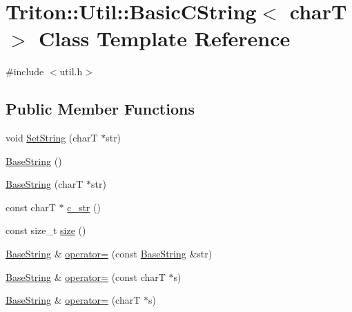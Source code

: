 \hypertarget{class_triton_1_1_util_1_1_basic_c_string}{}\section{Triton\+:\+:Util\+:\+:Basic\+C\+String$<$ char\+T $>$ Class Template Reference}
\label{class_triton_1_1_util_1_1_basic_c_string}


{\ttfamily \#include $<$util.\+h$>$}

\subsection*{Public Member Functions}
\begin{DoxyCompactItemize}
\item 
void \hyperlink{class_triton_1_1_util_1_1_basic_c_string_a8cbf5157c160261d599a9b07e1cbbfd6}{Set\+String} (char\+T $\ast$str)
\item 
\hyperlink{class_triton_1_1_util_1_1_basic_c_string_a447877a937847af393e6781c0a7b20cc}{Base\+String} ()
\item 
\hyperlink{class_triton_1_1_util_1_1_basic_c_string_acbbe555dcaf7b19fafcead09229bad7d}{Base\+String} (char\+T $\ast$str)
\item 
const char\+T $\ast$ \hyperlink{class_triton_1_1_util_1_1_basic_c_string_a80c260353113320de1a6479c9acf00db}{c\+\_\+str} ()
\item 
const size\+\_\+t \hyperlink{class_triton_1_1_util_1_1_basic_c_string_afd89c0bcef5000a3b44c21e58686e170}{size} ()
\item 
\hyperlink{class_triton_1_1_util_1_1_basic_c_string_a447877a937847af393e6781c0a7b20cc}{Base\+String} \& \hyperlink{class_triton_1_1_util_1_1_basic_c_string_a84b969651c1cb694349a7d57964c8c96}{operator=} (const \hyperlink{class_triton_1_1_util_1_1_basic_c_string_a447877a937847af393e6781c0a7b20cc}{Base\+String} \&str)
\item 
\hyperlink{class_triton_1_1_util_1_1_basic_c_string_a447877a937847af393e6781c0a7b20cc}{Base\+String} \& \hyperlink{class_triton_1_1_util_1_1_basic_c_string_af25fdcef2f66c34dadb24aab6139c9b4}{operator=} (const char\+T $\ast$s)
\item 
\hyperlink{class_triton_1_1_util_1_1_basic_c_string_a447877a937847af393e6781c0a7b20cc}{Base\+String} \& \hyperlink{class_triton_1_1_util_1_1_basic_c_string_ab0b8c472b9b4cfdacbdb5f923dcd78bd}{operator=} (char\+T $\ast$s)
\item 

\end{DoxyCompactItemize}
